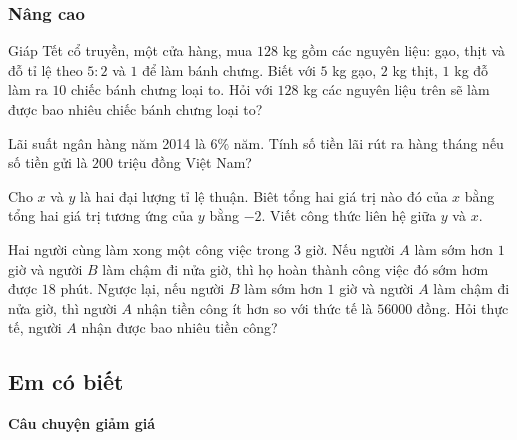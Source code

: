 \subsubsection{Nâng cao}

\begin{bt}%
	Giáp Tết cổ truyền, một cửa hàng, mua $128$ kg gồm các nguyên liệu: gạo, thịt và đỗ tỉ lệ theo $5:2$ và $1$ để làm bánh chưng. Biết với $5$ kg gạo, $2$ kg thịt, $1$ kg đỗ làm ra $10$ chiếc bánh chưng loại to. Hỏi với $128$ kg các nguyên liệu trên sẽ làm được bao nhiêu chiếc bánh chưng loại to?
\end{bt}

\begin{bt}%
	Lãi suất ngân hàng năm 2014 là $6\%$ năm. Tính số tiền lãi rút ra hàng tháng nếu số tiền gửi là $200$ triệu đồng Việt Nam?
\end{bt}

\begin{bt}%
	Cho $x$ và $y$ là hai đại lượng tỉ lệ thuận. Biêt tổng hai giá trị nào đó của $x$ bằng tổng hai giá trị tương ứng của $y$ bằng $-2$. Viết công thức liên hệ giữa $y$ và $x$.
\end{bt}

\begin{bt}%
	Hai người cùng làm xong một công việc trong $3$ giờ. Nếu người $A$ làm sớm hơn $1$ giờ và người $B$ làm chậm đi nửa giờ, thì họ hoàn thành công việc đó sớm hơm được $18$ phút. Ngược lại, nếu người $B$ làm sớm hơn $1$ giờ và người $A$ làm chậm đi nửa giờ, thì người $A$ nhận tiền công ít hơn so với thức tế là $56000$ đồng. Hỏi thực tế, người $A$ nhận được bao nhiêu tiền công?
\end{bt}

\subsection{Em có biết}
\begin{center}
	\textbf{Câu chuyện giảm giá}
\end{center}

